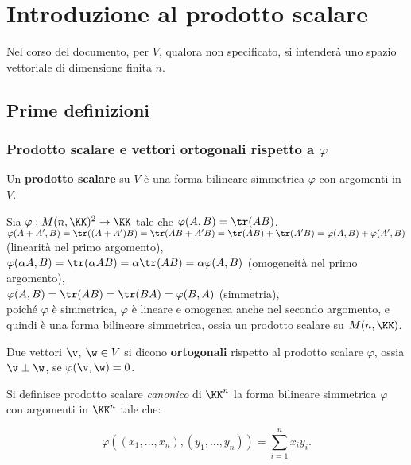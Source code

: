 \chapter{Introduzione al prodotto scalare}

\begin{note}
	Nel corso del documento, per $V$, qualora non specificato, si intenderà uno spazio vettoriale di dimensione
	finita $n$.
\end{note}

\section{Prime definizioni}

\subsection{Prodotto scalare e vettori ortogonali rispetto a \texorpdfstring{$\varphi$}{φ}}

\begin{definition} 
	Un \textbf{prodotto scalare} su $V$ è una forma bilineare simmetrica $\varphi$ con argomenti in $V$.
\end{definition}

\begin{example}
	Sia $\varphi : M(n, \KK)^2 \to \KK$ tale che $\varphi(A, B) = \tr(AB)$. \\
	
	\li $\varphi(A + A', B) = \tr((A + A')B) = \tr(AB + A'B) = \tr(AB) + \tr(A'B) = \varphi(A, B) + \varphi(A', B)$ (linearità
	nel primo argomento), \\
	\li $\varphi(\alpha A, B) = \tr(\alpha A B) = \alpha \tr(AB) = \alpha \varphi(A, B)$ (omogeneità nel primo argomento), \\
	\li $\varphi(A, B) = \tr(AB) = \tr(BA) = \varphi(B, A)$ (simmetria), \\
	\li poiché $\varphi$ è simmetrica, $\varphi$ è lineare e omogenea anche nel secondo argomento, e quindi è una
	forma bilineare simmetrica, ossia un prodotto scalare su $M(n, \KK)$.
\end{example}

\begin{definition} 
	Due vettori $\v$, $\w \in V$ si dicono \textbf{ortogonali} rispetto al prodotto scalare $\varphi$, ossia $\v \perp \w$, se $\varphi(\v, \w) = 0$.
\end{definition}

\begin{definition}
	Si definisce prodotto scalare \textit{canonico} di $\KK^n$ la forma bilineare simmetrica $\varphi$ con
	argomenti in $\KK^n$ tale che:
	
	\[ \varphi((x_1, ..., x_n), (y_1, ..., y_n)) = \sum_{i=1}^n x_i y_i. \]
\end{definition}

